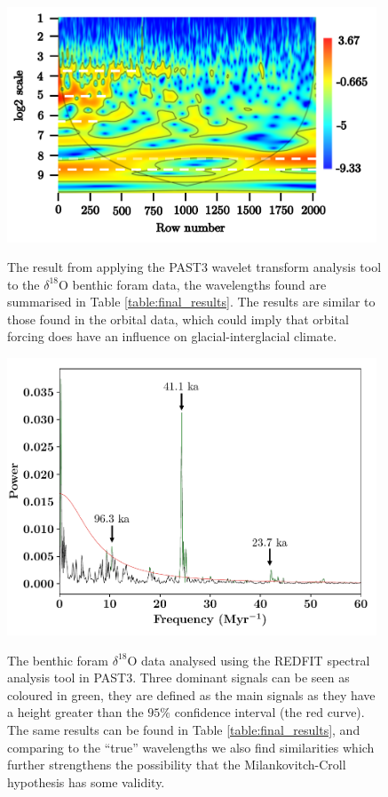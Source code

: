 \documentclass[12pt, onecolumn]{revtex4}    %
\begin{document}
\begin{figure}[!h]
\begin{center}
\includegraphics[width=11cm]{figures/wa_d18O.pdf}
\caption[]{The result from applying the PAST3 wavelet transform analysis tool to the $\delta^{18}$O benthic foram data, the wavelengths found are summarised in Table \ref{table:final_results}. The results are similar to those found in the orbital data, which could imply that orbital forcing does have an influence on glacial-interglacial climate.}
\vspace{-3ex}
\label{fig:wa_d18o}
\end{center}
\end{figure}

\begin{figure}[!h]
\begin{center}
\includegraphics[width=11cm]{figures/d18O_redfit}
\caption[]{The benthic foram $\delta^{18}$O data analysed using the REDFIT spectral analysis tool in PAST3. Three dominant signals can be seen as coloured in green, they are defined as the main signals as they have a height greater than the $95\%$ confidence interval (the red curve). The same results can be found in Table \ref{table:final_results}, and comparing to the ``true'' wavelengths we also find similarities which further strengthens the possibility that the Milankovitch-Croll hypothesis has some validity.}
\vspace{-3ex}
\label{fig:d18o_redfit}
\end{center}
\end{figure}
\end{document}
